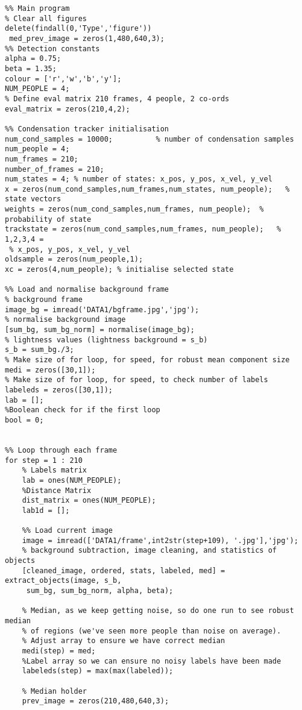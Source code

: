 \documentclass{article}
\begin{document}
\begin{lstlisting}
%% Main program 
% Clear all figures
delete(findall(0,'Type','figure'))
 med_prev_image = zeros(1,480,640,3);
%% Detection constants
alpha = 0.75;
beta = 1.35;
colour = ['r','w','b','y']; 
NUM_PEOPLE = 4;
% Define eval matrix 210 frames, 4 people, 2 co-ords
eval_matrix = zeros(210,4,2);

%% Condensation tracker initialisation
num_cond_samples = 10000;          % number of condensation samples
num_people = 4;
num_frames = 210;
number_of_frames = 210;
num_states = 4; % number of states: x_pos, y_pos, x_vel, y_vel
x = zeros(num_cond_samples,num_frames,num_states, num_people);   % state vectors
weights = zeros(num_cond_samples,num_frames, num_people);  % probability of state
trackstate = zeros(num_cond_samples,num_frames, num_people);   % 1,2,3,4 =
 % x_pos, y_pos, x_vel, y_vel      
oldsample = zeros(num_people,1); 
xc = zeros(4,num_people); % initialise selected state

%% Load and normalise background frame
% background frame
image_bg = imread('DATA1/bgframe.jpg','jpg'); 
% normalise background image
[sum_bg, sum_bg_norm] = normalise(image_bg);
% lightness values (lightness background = s_b)
s_b = sum_bg./3;
% Make size of for loop, for speed, for robust mean component size
medi = zeros([30,1]);
% Make size of for loop, for speed, to check number of labels 
labeleds = zeros([30,1]);
lab = [];
%Boolean check for if the first loop
bool = 0;


%% Loop through each frame
for step = 1 : 210
    % Labels matrix
    lab = ones(NUM_PEOPLE);
    %Distance Matrix
    dist_matrix = ones(NUM_PEOPLE);
    lab1d = [];
    
    %% Load current image
    image = imread(['DATA1/frame',int2str(step+109), '.jpg'],'jpg');
    % background subtraction, image cleaning, and statistics of objects
    [cleaned_image, ordered, stats, labeled, med] = extract_objects(image, s_b,
     sum_bg, sum_bg_norm, alpha, beta);
  
    % Median, as we keep getting noise, so do one run to see robust median
    % of regions (we've seen more people than noise on average).
    % Adjust array to ensure we have correct median
    medi(step) = med;
    %Label array so we can ensure no noisy labels have been made
    labeleds(step) = max(max(labeled));
    
    % Median holder
    prev_image = zeros(210,480,640,3);
    

\end{lstlisting}
\end{document}
